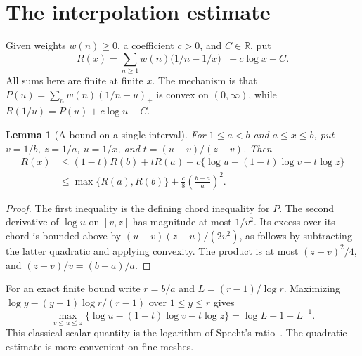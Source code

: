 \documentclass[11pt]{article}
\newtheorem{lemma}[theorem]{Lemma}
\newcommand{\pos}[1]{\bigl(#1\bigr)_{+}}
\newcommand{\R}{\mathbb{R}}
\begin{document}
\section{The interpolation estimate}
Given weights $w(n)\ge0$, a coefficient $c>0$, and $C\in\R$, put
\[
 R(x)=\sum_{n\ge1}w(n)\pos{1/n-1/x}-c\log x-C.
\]
All sums here are finite at finite $x$. The mechanism is that
$P(u)=\sum_n w(n)(1/n-u)_+$ is convex on $(0,\infty)$, while $R(1/u)=P(u)+c\log u-C$.

\begin{lemma}[A bound on a single interval]\label{l:chord}
For $1\le a<b$ and $a\le x\le b$, put $v=1/b$, $z=1/a$, $u=1/x$, and $t=(u-v)/(z-v)$. Then
\begin{align*}
 R(x)&\le (1-t)R(b)+tR(a)+c\{\log u-(1-t)\log v-t\log z\}\\
 &\le \max\{R(a),R(b)\}+\frac{c}{8}\left(\frac{b-a}{a}\right)^2 .
\end{align*}
\end{lemma}
\begin{proof}
The first inequality is the defining chord inequality for $P$. The second derivative of $\log u$ on $[v,z]$ has magnitude at most $1/v^2$. Its excess over its chord is bounded above by $(u-v)(z-u)/(2v^2)$, as follows by subtracting the latter quadratic and applying convexity. The product is at most $(z-v)^2/4$, and $(z-v)/v=(b-a)/a$.
\end{proof}

For an exact finite bound write $r=b/a$ and $L=(r-1)/\log r$. Maximizing $\log y-(y-1)\log r/(r-1)$ over $1\le y\le r$ gives
\[
 \max_{v\le u\le z}\{\log u-(1-t)\log v-t\log z\}=\log L-1+L^{-1}.
\]
This classical scalar quantity is the logarithm of Specht's ratio~\cite{specht}. The quadratic estimate is more convenient on fine meshes.
\end{document}
